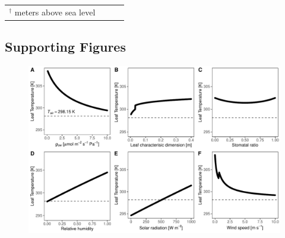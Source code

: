 \documentclass[11pt, oneside]{article}
\begin{document}
\begin{table}[ht]
\begin{center}
{\begin{tabular}{llll}
\bottomrule
{$^\dagger$ meters above sea level}

\end{tabular}}
\end{center}

\label{table:table_values}
\end{table}

\clearpage


\subsection*{Supporting Figures}

\begin{landscape}

\begin{figure}[ht]
\centerline{\includegraphics[width=\textheight]{../figures/figS1.pdf}}
\end{figure}

\end{landscape}
\end{document}
